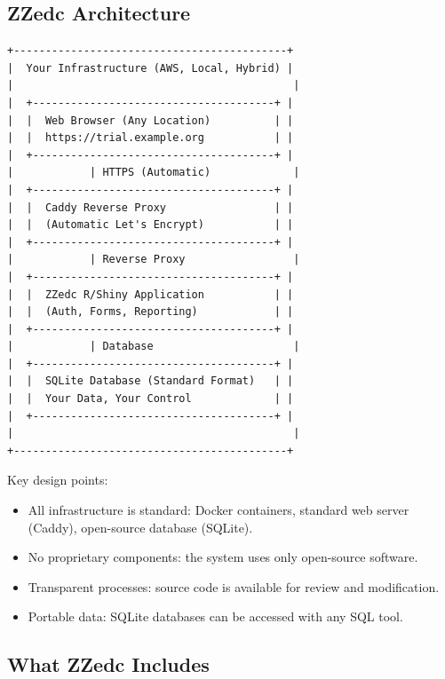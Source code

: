 \documentclass[
  letterpaper,
  DIV=11,
  numbers=noendperiod]{scrartcl}
\providecommand{\tightlist}{%
  \setlength{\itemsep}{0pt}\setlength{\parskip}{0pt}}
\begin{document}
\subsection{ZZedc Architecture}\label{zzedc-architecture}

\begin{verbatim}
+-------------------------------------------+
|  Your Infrastructure (AWS, Local, Hybrid) |
|                                            |
|  +--------------------------------------+ |
|  |  Web Browser (Any Location)          | |
|  |  https://trial.example.org           | |
|  +--------------------------------------+ |
|            | HTTPS (Automatic)             |
|  +--------------------------------------+ |
|  |  Caddy Reverse Proxy                 | |
|  |  (Automatic Let's Encrypt)           | |
|  +--------------------------------------+ |
|            | Reverse Proxy                 |
|  +--------------------------------------+ |
|  |  ZZedc R/Shiny Application           | |
|  |  (Auth, Forms, Reporting)            | |
|  +--------------------------------------+ |
|            | Database                      |
|  +--------------------------------------+ |
|  |  SQLite Database (Standard Format)   | |
|  |  Your Data, Your Control             | |
|  +--------------------------------------+ |
|                                            |
+-------------------------------------------+
\end{verbatim}

Key design points:

\begin{itemize}
\tightlist
\item
  All infrastructure is standard: Docker containers, standard web server
  (Caddy), open-source database (SQLite).
\item
  No proprietary components: the system uses only open-source software.
\item
  Transparent processes: source code is available for review and
  modification.
\item
  Portable data: SQLite databases can be accessed with any SQL tool.
\end{itemize}

\subsection{What ZZedc Includes}\label{what-zzedc-includes}
\end{document}
